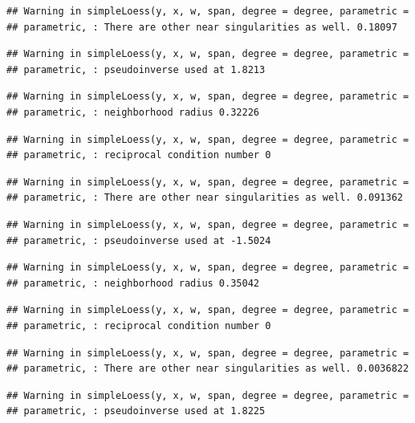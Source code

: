 \documentclass[]{article}
\begin{document}
\begin{verbatim}
## Warning in simpleLoess(y, x, w, span, degree = degree, parametric =
## parametric, : There are other near singularities as well. 0.18097
\end{verbatim}

\begin{verbatim}
## Warning in simpleLoess(y, x, w, span, degree = degree, parametric =
## parametric, : pseudoinverse used at 1.8213
\end{verbatim}

\begin{verbatim}
## Warning in simpleLoess(y, x, w, span, degree = degree, parametric =
## parametric, : neighborhood radius 0.32226
\end{verbatim}

\begin{verbatim}
## Warning in simpleLoess(y, x, w, span, degree = degree, parametric =
## parametric, : reciprocal condition number 0
\end{verbatim}

\begin{verbatim}
## Warning in simpleLoess(y, x, w, span, degree = degree, parametric =
## parametric, : There are other near singularities as well. 0.091362
\end{verbatim}

\begin{verbatim}
## Warning in simpleLoess(y, x, w, span, degree = degree, parametric =
## parametric, : pseudoinverse used at -1.5024
\end{verbatim}

\begin{verbatim}
## Warning in simpleLoess(y, x, w, span, degree = degree, parametric =
## parametric, : neighborhood radius 0.35042
\end{verbatim}

\begin{verbatim}
## Warning in simpleLoess(y, x, w, span, degree = degree, parametric =
## parametric, : reciprocal condition number 0
\end{verbatim}

\begin{verbatim}
## Warning in simpleLoess(y, x, w, span, degree = degree, parametric =
## parametric, : There are other near singularities as well. 0.0036822
\end{verbatim}

\begin{verbatim}
## Warning in simpleLoess(y, x, w, span, degree = degree, parametric =
## parametric, : pseudoinverse used at 1.8225
\end{verbatim}
\end{document}
